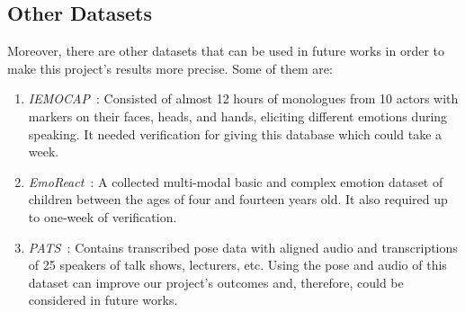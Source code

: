 \subsection{Other Datasets}
Moreover, there are other datasets that can be used in future works in order to make this project's results more precise. Some of them are:

\begin{enumerate}
	\item \emph{IEMOCAP~\cite{busso2008iemocap}}: Consisted of almost 12 hours of monologues from 10 actors with markers on their faces, heads, and hands, eliciting different emotions during speaking. It needed verification for giving this database which could take a week.
	\item \emph{EmoReact~\cite{nojavanasghari2016emoreact}}: A collected multi-modal basic and complex emotion dataset of children between the ages of four and fourteen years old. It also required up to one-week of verification.
	\item \emph{PATS~\cite{ahuja2020no,ahuja2020style,ginosar2019learning}}: Contains transcribed pose data with aligned audio and transcriptions of 25 speakers of talk shows, lecturers, etc. Using the pose and audio of this dataset can improve our project's outcomes and, therefore, could be considered in future works.
\end{enumerate}

